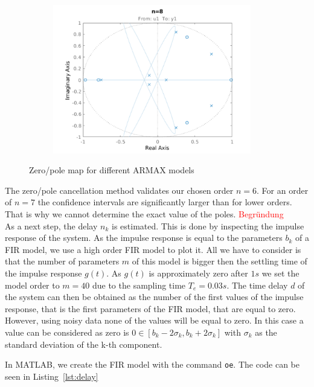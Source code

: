 \documentclass{scrartcl}
\begin{document}
\begin{figure}[h]
\begin{subfigure}{.49\textwidth}
		\label{fig:zp7}
	\end{subfigure}\hfill
	\begin{subfigure}{.49\textwidth}
		\includegraphics[height=6.5cm]{figures/zp8.pdf}
		\label{fig:zp8}
	\end{subfigure}
	\caption{Zero/pole map for different ARMAX models}
	\label{fig:zero_pole}
\end{figure}

The zero/pole cancellation method validates our chosen order $n=6$. For an order of $n=7$ the confidence intervals are significantly larger than for lower orders. That is why we cannot determine the exact value of the poles. \textcolor{red}{Begründung} \\

As a next step, the delay $n_k$ is estimated. This is done by inspecting the impulse response of the system. As the impulse response is equal to the parameters $b_k$ of a FIR model, we use a high order FIR model to plot it. All we have to consider is that the number of parameters $m$ of this model is bigger then the settling time of the impulse response $g(t)$. As $g(t)$ is approximately zero after $ 1 s$ we set the model order to $m = 40$ due to the sampling time $T_e = 0.03 s$.
The time delay $d$ of the system can then be obtained as the number of the first values of the impulse response, that is the first parameters of the FIR model, that are equal to zero. 
However, using noisy data none of the values will be equal to zero. In this case a value can be considered as zero is $ 0 \in \left[b_k -2 \sigma_k, b_k + 2\sigma_k \right] $ with $\sigma_k$ as the standard deviation of the k-th component. 

In MATLAB, we create the FIR model with the command \texttt{oe}. The code can be seen in Listing~\ref{lst:delay}
\end{document}
